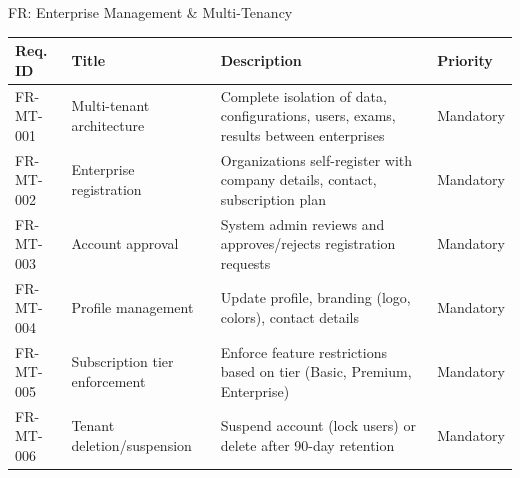\begin{frame}{FR: Enterprise Management \& Multi-Tenancy}
    \begin{table}[]
        \centering
        \tiny
        \begin{tabular}{|l|p{3.5cm}|p{5cm}|l|}
            \hline
            \textbf{Req. ID} & \textbf{Title} & \textbf{Description} & \textbf{Priority} \\
            \hline
            FR-MT-001 & Multi-tenant architecture & Complete isolation of data, configurations, users, exams, results between enterprises & Mandatory \\
            \hline
            FR-MT-002 & Enterprise registration & Organizations self-register with company details, contact, subscription plan & Mandatory \\
            \hline
            FR-MT-003 & Account approval & System admin reviews and approves/rejects registration requests & Mandatory \\
            \hline
            FR-MT-004 & Profile management & Update profile, branding (logo, colors), contact details & Mandatory \\
            \hline
            FR-MT-005 & Subscription tier enforcement & Enforce feature restrictions based on tier (Basic, Premium, Enterprise) & Mandatory \\
            \hline
            FR-MT-006 & Tenant deletion/suspension & Suspend account (lock users) or delete after 90-day retention & Mandatory \\
            \hline
        \end{tabular}
    \end{table}
\end{frame}


